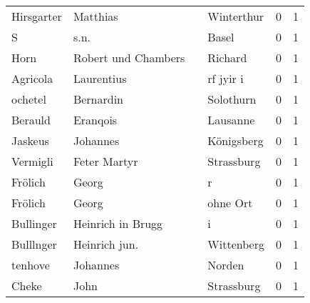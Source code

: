 \begin{center}
\begin{tiny}
\begin{longtabu}{llllrr}
               Hirsgarter &                           Matthias &             &                                  Winterthur &          0 &         1 \\
                        S &                               s.n. &             &                                       Basel &          0 &         1 \\
                     Horn &                Robert und Chambers &             &                                     Richard &          0 &         1 \\
                 Agricola &                         Laurentius &             &                                   rf jyir i &          0 &         1 \\
                  ochetel &                          Bernardin &             &                                   Solothurn &          0 &         1 \\
                  Berauld &                           Eranqois &             &                                    Lausanne &          0 &         1 \\
                  Jaskeus &                           Johannes &             &                                  Königsberg &          0 &         1 \\
                 Vermigli &                       Feter Martyr &             &                                  Strassburg &          0 &         1 \\
                  Frölich &                              Georg &             &                                           r &          0 &         1 \\
                  Frölich &                              Georg &             &                                    ohne Ort &          0 &         1 \\
                Bullinger &                  Heinrich in Brugg &             &                                           i &          0 &         1 \\
                Bulllnger &                      Heinrich jun. &             &                                  Wittenberg &          0 &         1 \\
                  tenhove &                           Johannes &             &                                      Norden &          0 &         1 \\
                    Cheke &                               John &             &                                  Strassburg &          0 &         1 \\

\end{longtabu}
\end{tiny}
\end{center}
